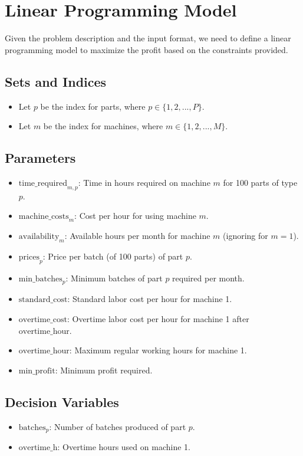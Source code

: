 \documentclass{article}
\begin{document}
\section*{Linear Programming Model}

Given the problem description and the input format, we need to define a linear programming model to maximize the profit based on the constraints provided.

\subsection*{Sets and Indices}
\begin{itemize}
    \item Let \( p \) be the index for parts, where \( p \in \{1, 2, ..., P\} \).
    \item Let \( m \) be the index for machines, where \( m \in \{1, 2, ..., M\} \).
\end{itemize}

\subsection*{Parameters}
\begin{itemize}
    \item \( \text{time\_required}_{m,p} \): Time in hours required on machine \( m \) for 100 parts of type \( p \).
    \item \( \text{machine\_costs}_{m} \): Cost per hour for using machine \( m \).
    \item \( \text{availability}_{m} \): Available hours per month for machine \( m \) (ignoring for \( m=1 \)).
    \item \( \text{prices}_{p} \): Price per batch (of 100 parts) of part \( p \).
    \item \( \text{min\_batches}_{p} \): Minimum batches of part \( p \) required per month.
    \item \( \text{standard\_cost} \): Standard labor cost per hour for machine 1.
    \item \( \text{overtime\_cost} \): Overtime labor cost per hour for machine 1 after \( \text{overtime\_hour} \).
    \item \( \text{overtime\_hour} \): Maximum regular working hours for machine 1.
    \item \( \text{min\_profit} \): Minimum profit required.
\end{itemize}

\subsection*{Decision Variables}
\begin{itemize}
    \item \( \text{batches}_{p} \): Number of batches produced of part \( p \).
    \item \( \text{overtime\_h} \): Overtime hours used on machine 1.
\end{itemize}
\end{document}
